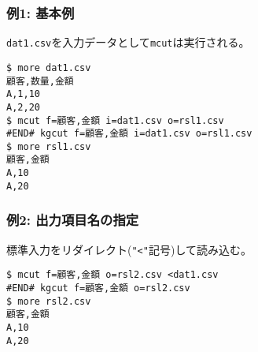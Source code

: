\subsubsection*{例1: 基本例}

\verb|dat1.csv|を入力データとして\verb|mcut|は実行される。


\begin{Verbatim}[baselinestretch=0.7,frame=single]
$ more dat1.csv
顧客,数量,金額
A,1,10
A,2,20
$ mcut f=顧客,金額 i=dat1.csv o=rsl1.csv
#END# kgcut f=顧客,金額 i=dat1.csv o=rsl1.csv
$ more rsl1.csv
顧客,金額
A,10
A,20
\end{Verbatim}
\subsubsection*{例2: 出力項目名の指定}

標準入力をリダイレクト(\verb|"<"|記号)して読み込む。


\begin{Verbatim}[baselinestretch=0.7,frame=single]
$ mcut f=顧客,金額 o=rsl2.csv <dat1.csv
#END# kgcut f=顧客,金額 o=rsl2.csv
$ more rsl2.csv
顧客,金額
A,10
A,20
\end{Verbatim}
